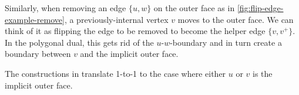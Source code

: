 Similarly, when removing an edge $\{u,w\}$ on the outer face as in \cref{fig:flip-edge-example-remove}, a previously-internal vertex $v$ moves to the outer face. We can think of it as flipping the edge to be removed to become the helper edge $\{v,v^+\}$. In the polygonal dual, this gets rid of the $u$-$w$-boundary and in turn create a boundary between $v$ and the implicit outer face.

The constructions in  translate 1-to-1 to the case where either $u$ or $v$ is the implicit outer face.
